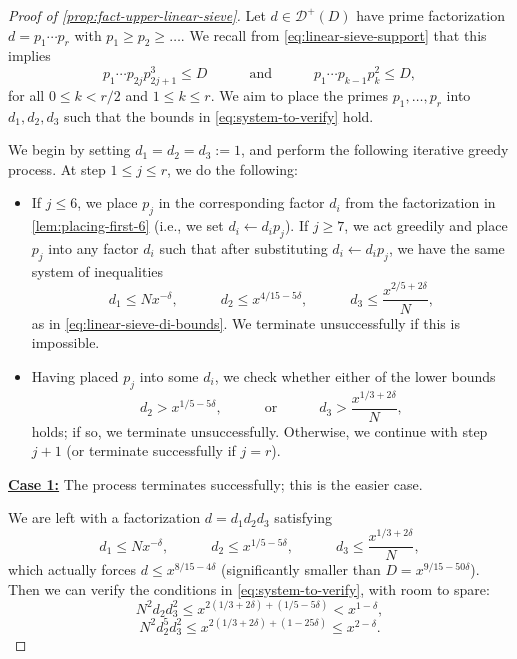 \documentclass[reqno,11pt]{amsart}
\theoremstyle{remark}
\numberwithin{equation}{section}
\newcommand{\mD}{\mathcal{D}}
\begin{document}
\begin{proof}[Proof of \cref{prop:fact-upper-linear-sieve}]
Let $d \in \mD^+(D)$ have prime factorization $d = p_1 \cdots p_r$ with $p_1 \ge p_2 \ge \ldots$. We recall from \cref{eq:linear-sieve-support} that this implies
\[
    p_1 \cdots p_{2j} p_{2j+1}^3 \le D \qquad\quad \text{and} \qquad\quad 
    p_1 \cdots p_{k-1} p_k^2 \le D,
\]
for all $0 \le k < r/2$ and $1 \le k \le r$. We aim to place the primes $p_1, \ldots, p_r$ into $d_1, d_2, d_3$ such that the bounds in \cref{eq:system-to-verify} hold.

We begin by setting $d_1 = d_2 = d_3 := 1$, and perform the following iterative greedy process. At step $1 \le j \le r$, we do the following:
\begin{itemize}
    \item[$j.(i)$.] If $j \le 6$, we place $p_j$ in the corresponding factor $d_i$ from the factorization in \cref{lem:placing-first-6} (i.e., we set $d_i \gets d_i p_j$). If $j \ge 7$, we act greedily and place $p_j$ into any factor $d_i$ such that after substituting $d_i \gets d_i p_j$, we have the same system of inequalities
    \[
        d_1 \le N x^{-\delta}, \qquad\quad 
        d_2 \le x^{4/15 - 5\delta}, \qquad\quad 
        d_3 \le \frac{x^{2/5 + 2\delta}}{N},
    \]
    as in \cref{eq:linear-sieve-di-bounds}.
    We terminate unsuccessfully if this is impossible.
    \item[$j.(ii)$.] Having placed $p_j$ into some $d_i$, we check whether either of the lower bounds
    \[
        d_2 > x^{1/5 - 5\delta}, \qquad\quad \text{or} \qquad\quad 
        d_3 > \frac{x^{1/3 + 2\delta}}{N},
    \]
    holds; if so, we terminate unsuccessfully. Otherwise, we continue with step $j+1$ (or terminate successfully if $j = r$).
\end{itemize}

\underline{\textbf{Case 1:}} The process terminates successfully; this is the easier case.

We are left with a factorization $d = d_1 d_2 d_3$ satisfying
\[
    d_1 \le N x^{-\delta}, \qquad\quad d_2 \le x^{1/5-5\delta},
    \qquad\quad 
    d_3 \le \frac{x^{1/3+2\delta}}{N},
\]
which actually forces $d \le x^{8/15 - 4\delta}$ (significantly smaller than $D = x^{9/15 - 50\delta}$). Then we can verify the conditions in \cref{eq:system-to-verify}, with room to spare:
\[
    N^2 d_2 d_3^2 \le x^{2(1/3 + 2\delta) + (1/5 - 5\delta)}
    <
    x^{1-\delta},
\]
\[
    N^2 d_2^5 d_3^2 \le x^{2(1/3+2\delta) + (1-25\delta)} \le x^{2-\delta}.
\]


\end{proof}
\end{document}
